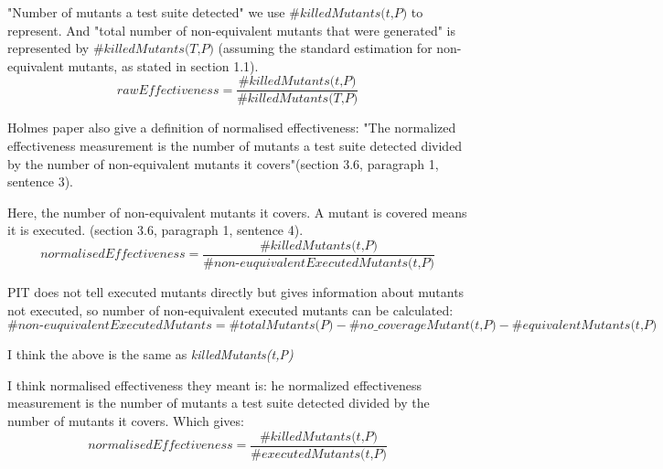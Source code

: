 \documentclass[a4paper]{article}
\begin{document}
"Number of mutants a test suite detected" we use $\#\textit{killedMutants(t,P)}$ to represent. And "total number of non-equivalent mutants that were generated" is represented by $\#\textit{killedMutants(T,P)}$ (assuming the standard estimation for non-equivalent mutants, as stated in section 1.1).
\[\textit{rawEffectiveness} = \frac{\#\textit{killedMutants(t,P)}}{\#\textit{killedMutants(T,P)}}\]

Holmes paper also give a definition of normalised effectiveness: "The normalized effectiveness measurement is the number of mutants a test suite detected divided
by the number of non-equivalent mutants it covers"(section 3.6, paragraph 1, sentence 3).

Here, the number of non-equivalent mutants it covers. A mutant is covered means it is executed. (section 3.6, paragraph 1, sentence 4).
\[\textit{normalisedEffectiveness} = \frac{\#\textit{killedMutants(t,P)}}{\#\textit{non-euquivalentExecutedMutants(t,P)}}\]

PIT does not tell executed mutants directly but gives information about mutants not executed, so number of non-equivalent executed mutants can be calculated:
\[\#\textit{non-euquivalentExecutedMutants} = \#\textit{totalMutants(P)} - \#\textit{no\_coverageMutant(t,P)}-\#\textit{equivalentMutants(t,P)}\]

I think the above is the same as \textit{killedMutants(t,P)}

I think normalised effectiveness they meant is: he normalized effectiveness measurement is the number of mutants a test suite detected divided by the number of mutants it covers. Which gives:
 \[\textit{normalisedEffectiveness} = \frac{\#\textit{killedMutants(t,P)}}{\#\textit{executedMutants(t,P)}}\]
\end{document}
